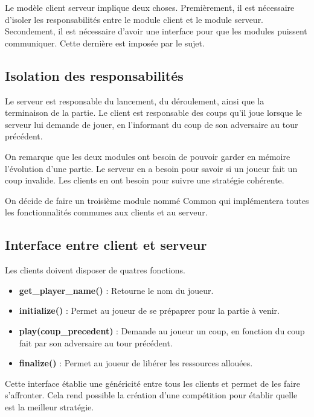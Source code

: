 Le modèle client serveur implique deux choses.
Premièrement, il est nécessaire d'isoler les responsabilités entre le module client et le module serveur.
Secondement, il est nécessaire d'avoir une interface pour que les modules puissent communiquer.
Cette dernière est imposée par le sujet.

\subsection{Isolation des responsabilités}

Le serveur est responsable du lancement, du déroulement, ainsi que la terminaison de la partie.
Le client est responsable des coups qu'il joue lorsque le serveur lui demande de jouer, 
en l'informant du coup de son adversaire au tour précédent.

On remarque que les deux modules ont besoin de pouvoir garder en mémoire l'évolution d'une partie.
Le serveur en a besoin pour savoir si un joueur fait un coup invalide.
Les clients en ont besoin pour suivre une stratégie cohérente.

On décide de faire un troisième module nommé Common qui implémentera toutes les fonctionnalités communes 
aux clients et au serveur.

\subsection{Interface entre client et serveur}

Les clients doivent disposer de quatres fonctions.
\begin{itemize}
    \item \textbf{get\_player\_name()} : Retourne le nom du joueur.
    \item \textbf{initialize()} : Permet au joueur de se prépaprer pour la partie à venir.
    \item \textbf{play(coup\_precedent)} : Demande au joueur un coup, en fonction 
    du coup fait par son adversaire au tour précédent.
    \item \textbf{finalize()} : Permet au joueur de libérer les ressources allouées.
\end{itemize}

Cette interface établie une généricité entre tous les clients et permet de les faire s'affronter.
Cela rend possible la création d'une compétition pour établir quelle est 
la meilleur stratégie.